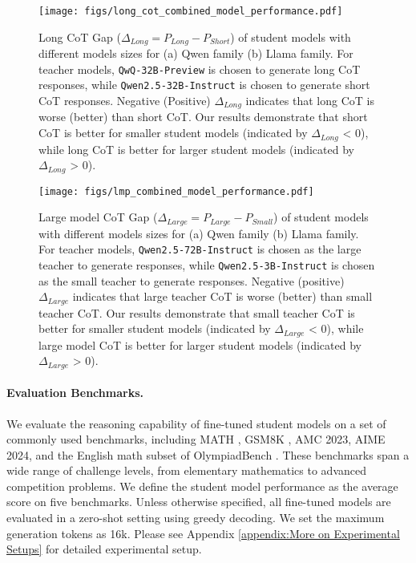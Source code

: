 \begin{figure*}[!t]
    \centering
    \texttt{[image: figs/long\_cot\_combined\_model\_performance.pdf]}
    \caption{Long CoT Gap ($\Delta_{Long}=P_{Long} - P_{Short}$) of student models with different models sizes for (a) Qwen family (b) Llama family. For teacher models, \texttt{QwQ-32B-Preview} is chosen to generate long CoT responses, while \texttt{Qwen2.5-32B-Instruct} is chosen to generate short CoT responses. Negative (Positive) $\Delta_{Long}$ indicates that long CoT is worse (better) than short CoT. Our results demonstrate that short CoT is better for smaller student models (indicated by $\Delta_{Long}$ < 0), while long CoT is better for larger student models (indicated by $\Delta_{Long}$ > 0).}
    \label{fig:combined_model_performance}
\end{figure*}
\begin{figure*}[!t]
    \centering
    \texttt{[image: figs/lmp\_combined\_model\_performance.pdf]}
    \caption{Large model CoT Gap ($\Delta_{Large}=P_{Large} - P_{Small}$) of student models with different models sizes for (a) Qwen family (b) Llama family. For teacher models, \texttt{Qwen2.5-72B-Instruct} is chosen as the large teacher to generate responses, while \texttt{Qwen2.5-3B-Instruct} is chosen as the small teacher to generate responses. Negative (positive) $\Delta_{Large}$ indicates that large teacher CoT is worse (better) than small teacher CoT. Our results demonstrate that small teacher CoT is better for smaller student models (indicated by $\Delta_{Large}$ < 0), while large model CoT is better for larger student models (indicated by $\Delta_{Large}$ > 0).}
    \label{fig:lmp_combined_model_performance}
\end{figure*}

\paragraph{Evaluation Benchmarks.} 


We evaluate the reasoning capability of fine-tuned student models on a set of commonly used benchmarks, including MATH \citep{hendrycks2021measuringmathematicalproblemsolving}, GSM8K \citep{cobbe2021trainingverifierssolvemath}, AMC 2023, AIME 2024, and the English math subset of OlympiadBench \citep{he2024olympiadbenchchallengingbenchmarkpromoting}. These benchmarks span a wide range of challenge levels, from elementary mathematics to advanced competition problems. 
We define the student model performance as the average score on five benchmarks. Unless otherwise specified, all fine-tuned models are evaluated in a zero-shot setting using greedy decoding. We set the maximum generation tokens as 16k. Please see Appendix \ref{appendix:More on Experimental Setups} for detailed experimental setup.

